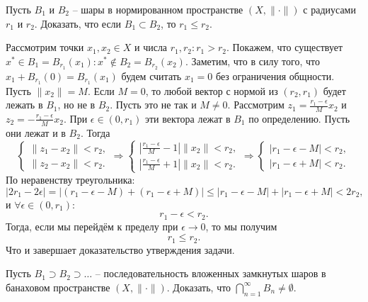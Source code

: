 \begin{task}[\S 4.7]
    Пусть $B_1$ и $B_2$ -- шары в нормированном пространстве $(X, \|\cdot\|)$ с радиусами $r_1$ и $r_2$. Доказать, что если $B_1 \subset B_2$, то $r_1 \leq r_2$.
\end{task}
\begin{solve}
    Рассмотрим точки $x_1, x_2 \in X$ и числа $r_1, r_2\colon r_1 > r_2$. Покажем, что существует $x^* \in B_1 = B_{r_1}(x_1)\colon x^* \notin B_2 = B_{r_2}(x_2)$. Заметим, что в силу того, что $x_1 + B_{r_1}(0) = B_{r_1}(x_1)$ будем считать $x_1 = 0$ без ограничения общности. Пусть $\|x_2\| = M$. Если $M = 0$, то любой вектор с нормой из $(r_2, r_1)$ будет лежать в $B_1$, но не в $B_2$. Пусть это не так и $M \neq 0$. Рассмотрим $z_1 = \frac{r_1 - \epsilon}{M}x_2$ и $z_2 = -\frac{r_1 - \epsilon}{M}x_2$. При $\epsilon \in (0, r_1)$ эти вектора лежат в $B_1$ по определению. Пусть они лежат и в $B_2$. Тогда
    \[
        \begin{cases}
            \|z_1 - x_2\| < r_2, \\
            \|z_2 - x_2\| < r_2.
        \end{cases}
        \Rightarrow
        \begin{cases}
            |\frac{r_1 - \epsilon}{M} - 1|\|x_2\| < r_2, \\
            |\frac{r_1 - \epsilon}{M} + 1|\|x_2\| < r_2.
        \end{cases}
        \Rightarrow
        \begin{cases}
            |r_1 - \epsilon - M| < r_2, \\
            |r_1 - \epsilon + M| < r_2.
        \end{cases}
    \]
    По неравенству треугольника:
    \[
        |2r_1 - 2\epsilon| = |(r_1 - \epsilon - M) + (r_1 - \epsilon + M)| \leq |r_1 - \epsilon - M| + |r_1 - \epsilon + M| < 2r_2,
    \]
    и $\forall \epsilon \in (0, r_1)\colon$
    \[
        r_1 - \epsilon < r_2.
    \]
    Тогда, если мы перейдём к пределу при $\epsilon \rightarrow 0$, то мы получим
    \[
        r_1 \leq r_2.
    \]
    Что и завершает доказательство утверждения задачи.
\end{solve}
\begin{task}[\S 4.8]
    Пусть $B_1 \supset B_2 \supset \ldots$ -- последовательность вложенных замкнутых шаров в банаховом пространстве $(X, \|\cdot\|)$. Доказать, что $\bigcap_{n = 1}^\infty B_n \neq \emptyset$.
\end{task}
